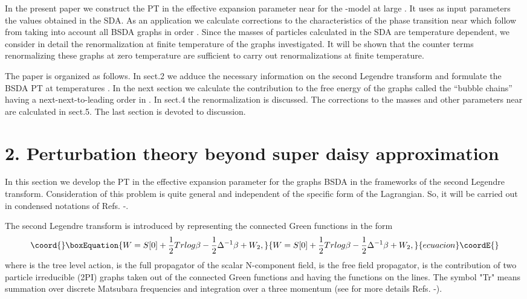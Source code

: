 \documentclass[a4paper,12pt]{article}
\begin{document}
In the present paper we construct the PT in the effective expansion
parameter \coordHE{} near \coordHE{} for the
\coordHE{}-model at large \coordHE{}. It uses as input parameters the values
obtained in the SDA. As an application we calculate corrections to the
characteristics of the phase transition near \coordHE{} which follow from
taking into account all BSDA graphs in order \coordHE{}.  Since
the masses of particles calculated in the SDA are temperature
dependent, we consider in detail the renormalization at finite
temperature of the graphs investigated. It will be shown that the
counter terms renormalizing these graphs at zero temperature are
sufficient to carry out renormalizations at finite temperature.

The paper is organized as follows. In sect.2 we adduce the necessary
information on the second Legendre transform and formulate the BSDA PT
at temperatures \coordHE{}.  In the next section we calculate the
contribution to the free energy of the graphs called the ``bubble chains''
having a next-next-to-leading order in \coordHE{}. In sect.4 the
renormalization is discussed. The corrections to the masses and other
parameters near \coordHE{} are calculated in sect.5. The last section is
devoted to discussion.

\section*{2. Perturbation theory beyond super daisy approximation}
In this section we develop the PT in the effective expansion parameter
\coordHE{} for the graphs BSDA in the frameworks
of the second Legendre transform. Consideration of this problem is
quite general and independent of the specific form of the
Lagrangian. So, it will be carried out in condensed notations of
Refs. \cite{Bordag1}-\cite{pl}.

The second Legendre transform is introduced by  representing  
the connected Green functions in the form
\begin{equation}\coord{}\boxEquation{ \label{slt}
W = S[0] + \frac{1}{2} Tr log \beta - \frac{1}{2} \Delta^{-1} \beta +
W_2,
}{ W = S[0] + \frac{1}{2} Tr log \beta - \frac{1}{2} \Delta^{-1} \beta +
W_2,
}{ecuacion}\coordE{}\end{equation}
where \coordHE{} is the tree level action, \myHighlight{$\beta$}\coordHE{} is the full propagator
of the scalar N-component field, \myHighlight{$\Delta $}\coordHE{} is the free field
propagator, \coordHE{} is the contribution of two particle irreducible
(2PI) graphs taken out of the connected Green functions and having the
functions \coordHE{} on the lines. The symbol "Tr" means summation
over discrete Matsubara frequencies and integration over a three
momentum (see for more details Refs. \cite{Bordag1}-\cite{pl}).
\end{document}
